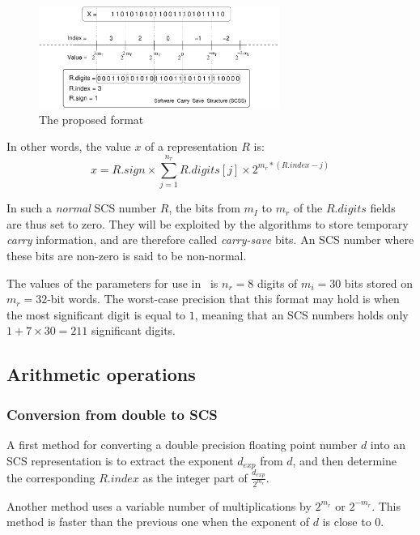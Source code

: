 \begin{figure}[h]
\begin{center}
\includegraphics[width=0.7\textwidth]{fig_scs/exponent_representation} %
\caption{The proposed format \label{fig:scsrepresentation}}
\end{center}
\end{figure}
  
In other words, the value  $x$ of a representation $R$  is:
\begin{equation}
\label{eqn4}
x = R.sign \times \sum_{j=1}^{n_r} R.digits[j] \times 2^{m_r * (R.index - j)}
\end{equation}

In such a \emph{normal} SCS number $R$, the bits from $m_I$ to $m_r$
of the $R.digits$ fields are thus set to zero. They will be exploited
by the algorithms to store temporary \emph{carry} information, and are
therefore called \emph{carry-save} bits. An SCS number where these
bits are non-zero is said to be non-normal.

The values of the parameters for use in \crlibm\ is $n_r=8$ digits of
$m_i=30$ bits stored on $m_r=32$-bit words. The worst-case precision
that this format may hold is when the most significant digit is equal
to $1$, meaning that an SCS numbers holds only $1+7\times 30=211$
significant digits.


\subsection{Arithmetic operations\label{sec:ops}}


\subsubsection{Conversion from double to SCS}
 A first method for converting a double precision floating
point number $d$ into an SCS representation is to extract the
exponent $d_{exp}$ from $d$, and then determine the corresponding
$R.index$ as the integer part of
$\frac{d_{exp}}{2^{m_r}}$.

Another method uses a variable number of multiplications by
$2^{m_r}$ or $2^{-m_r}$. This method is faster than the previous one
when the exponent of $d$ is close to $0$.

